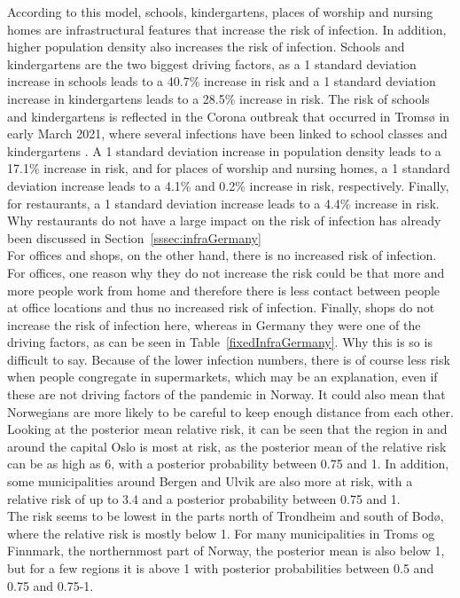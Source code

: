 According to this model, schools, kindergartens, places of worship and nursing homes are infrastructural features that increase the risk of infection. In addition, higher population density also increases the risk of infection. Schools and kindergartens are the two biggest driving factors, as a 1 standard deviation increase in schools leads to a 40.7\% increase in risk and a 1 standard deviation increase in kindergartens leads to a 28.5\% increase in risk. The risk of schools and kindergartens is reflected in the Corona outbreak that occurred in Tromsø in early March 2021, where several infections have been linked to school classes and kindergartens \cite{tromsokorona}. A 1 standard deviation increase in population density leads to a 17.1\% increase in risk, and for places of worship and nursing homes, a 1 standard deviation increase leads to a 4.1\% and 0.2\% increase in risk, respectively. Finally, for restaurants, a 1 standard deviation increase leads to a 4.4\% increase in risk. Why restaurants do not have a large impact on the risk of infection has already been discussed in Section~\ref{sssec:infraGermany}
\\
For offices and shops, on the other hand, there is no increased risk of infection. For offices, one reason why they do not increase the risk could be that more and more people work from home and therefore there is less contact between people at office locations and thus no increased risk of infection. Finally, shops do not increase the risk of infection here, whereas in Germany they were one of the driving factors, as can be seen in Table~\ref{fixedInfraGermany}. Why this is so is difficult to say. Because of the lower infection numbers, there is of course less risk when people congregate in supermarkets, which may be an explanation, even if these are not driving factors of the pandemic in Norway. It could also mean that Norwegians are more likely to be careful to keep enough distance from each other. \\
Looking at the posterior mean relative risk, it can be seen that the region in and around the capital Oslo is most at risk, as the posterior mean of the relative risk can be as high as 6, with a posterior probability between 0.75 and 1. In addition, some municipalities around Bergen and Ulvik are also more at risk, with a relative risk of up to 3.4 and a posterior probability between 0.75 and 1. \\
The risk seems to be lowest in the parts north of Trondheim and south of Bodø, where the relative risk is mostly below 1. For many municipalities in Troms og Finnmark, the northernmost part of Norway, the posterior mean is also below 1, but for a few regions it is above 1 with posterior probabilities between 0.5 and 0.75 and 0.75-1.
